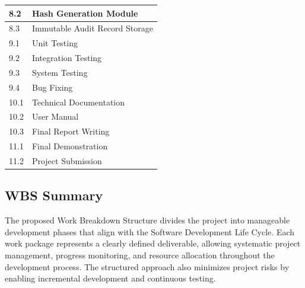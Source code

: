 \begin{longtable}{|p{2cm}|p{11cm}|}
\hline
8.2 & Hash Generation Module \\
\hline
8.3 & Immutable Audit Record Storage \\
\hline
9.1 & Unit Testing \\
\hline
9.2 & Integration Testing \\
\hline
9.3 & System Testing \\
\hline
9.4 & Bug Fixing \\
\hline
10.1 & Technical Documentation \\
\hline
10.2 & User Manual \\
\hline
10.3 & Final Report Writing \\
\hline
11.1 & Final Demonstration \\
\hline
11.2 & Project Submission \\
\hline
\end{longtable}


\subsection{WBS Summary}

The proposed Work Breakdown Structure divides the project into manageable development phases that align with the Software Development Life Cycle. Each work package represents a clearly defined deliverable, allowing systematic project management, progress monitoring, and resource allocation throughout the development process. The structured approach also minimizes project risks by enabling incremental development and continuous testing.